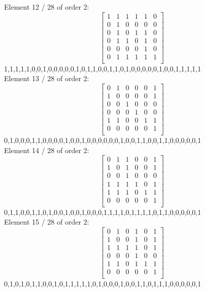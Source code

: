 Element    12 / 28 of order 2:
$$
\left[
\begin{array}{*{6}{r}}
1 & 1 & 1 & 1 & 1 & 0\\
0 & 1 & 0 & 0 & 0 & 0\\
0 & 1 & 0 & 1 & 1 & 0\\
0 & 1 & 1 & 0 & 1 & 0\\
0 & 0 & 0 & 0 & 1 & 0\\
0 & 1 & 1 & 1 & 1 & 1\\
\end{array}
\right]
$$
1,1,1,1,1,0,0,1,0,0,0,0,0,1,0,1,1,0,0,1,1,0,1,0,0,0,0,0,1,0,0,1,1,1,1,1\\
Element    13 / 28 of order 2:
$$
\left[
\begin{array}{*{6}{r}}
0 & 1 & 0 & 0 & 0 & 1\\
1 & 0 & 0 & 0 & 0 & 1\\
0 & 0 & 1 & 0 & 0 & 0\\
0 & 0 & 0 & 1 & 0 & 0\\
1 & 1 & 0 & 0 & 1 & 1\\
0 & 0 & 0 & 0 & 0 & 1\\
\end{array}
\right]
$$
0,1,0,0,0,1,1,0,0,0,0,1,0,0,1,0,0,0,0,0,0,1,0,0,1,1,0,0,1,1,0,0,0,0,0,1\\
Element    14 / 28 of order 2:
$$
\left[
\begin{array}{*{6}{r}}
0 & 1 & 1 & 0 & 0 & 1\\
1 & 0 & 1 & 0 & 0 & 1\\
0 & 0 & 1 & 0 & 0 & 0\\
1 & 1 & 1 & 1 & 0 & 1\\
1 & 1 & 1 & 0 & 1 & 1\\
0 & 0 & 0 & 0 & 0 & 1\\
\end{array}
\right]
$$
0,1,1,0,0,1,1,0,1,0,0,1,0,0,1,0,0,0,1,1,1,1,0,1,1,1,1,0,1,1,0,0,0,0,0,1\\
Element    15 / 28 of order 2:
$$
\left[
\begin{array}{*{6}{r}}
0 & 1 & 0 & 1 & 0 & 1\\
1 & 0 & 0 & 1 & 0 & 1\\
1 & 1 & 1 & 1 & 0 & 1\\
0 & 0 & 0 & 1 & 0 & 0\\
1 & 1 & 0 & 1 & 1 & 1\\
0 & 0 & 0 & 0 & 0 & 1\\
\end{array}
\right]
$$
0,1,0,1,0,1,1,0,0,1,0,1,1,1,1,1,0,1,0,0,0,1,0,0,1,1,0,1,1,1,0,0,0,0,0,1\\
